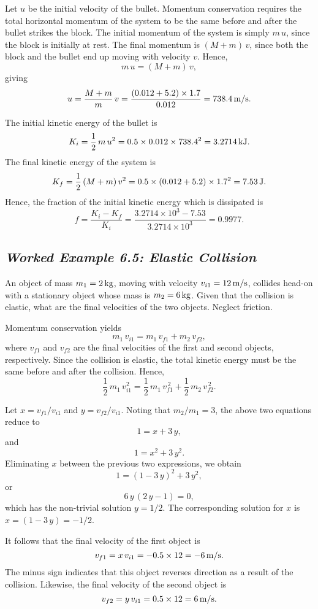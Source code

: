  Let $u$ be the initial velocity of the bullet.
Momentum conservation requires the total horizontal momentum of the
system to be the same before and after the bullet strikes the block.
The initial momentum of the system is simply $m\,u$, since the
block is initially at rest. The final momentum is $(M+m)\,v$, since
both the block and the bullet end up moving with velocity $v$. Hence,
$$
m\,u = (M+m)\,v,
$$
giving
$$
u = \frac{M+m}{m}\,v = \frac{(0.012+5.2)\times 1.7}{0.012} = 738.4\,{\rm m/s}.
$$

The initial kinetic energy of the bullet is
$$
K_i = \frac{1}{2}\,m\,u^2 = 0.5\times 0.012 \times 738.4^2 = 3.2714\,{\rm kJ}.
$$
The final kinetic energy of the system is
$$
K_f = \frac{1}{2}\,(M+m)\,v^2 = 0.5\times(0.012+5.2)\times 1.7^2 = 7.53\,{\rm J}.
$$
Hence, the fraction of the initial kinetic energy which is dissipated is
$$
f = \frac{K_i-K_f}{K_i} = \frac{3.2714\times 10^3-7.53}{3.2714\times 10^3} = 0.9977.
$$

\subsection*{\em Worked Example 6.5: Elastic Collision}
 An object of mass $m_1=2\,{\rm kg}$, moving
with velocity $v_{i1}= 12\,{\rm m/s}$,  collides head-on with
a stationary object whose mass is $m_2=6\,{\rm kg}$. Given that the collision
is elastic, what are the final velocities of the two objects. Neglect friction.

 Momentum conservation yields
$$
m_1\,v_{i1} = m_1\,v_{f1} + m_2\,v_{f2},
$$
where $v_{f1}$ and $v_{f2}$ are the final velocities of the first and second
objects, respectively. Since the collision is elastic, the total kinetic
energy must be the same before and after the collision. Hence,
$$
\frac{1}{2}\,m_1\,v_{i1}^2 = \frac{1}{2}\,m_1\,v_{f1}^{\,2} + \frac{1}{2}\,m_2 \,v_{f2}^{\,2}.
$$

Let $x=v_{f1}/v_{i1}$ and $y=v_{f2}/v_{i1}$. Noting that $m_2/m_1=3$, the above two
equations reduce to
$$
1 = x + 3\,y,
$$
and
$$
1 = x^2 + 3\,y^2.
$$
Eliminating $x$ between the previous two expressions, we obtain
$$
1 = (1-3\,y)^2 + 3\,y^2,
$$
or
$$
6\,y\,(2\,y-1)=0,
$$
which has the non-trivial solution $y=1/2$. The corresponding solution for $x$ is $x=
(1-3\,y)=-1/2$.

It follows that the final velocity of the first object is
$$
v_{f1} = x\,v_{i1} = -0.5\times12 = -6\,{\rm m/s}.
$$
The minus sign indicates that this object reverses direction as a
result of the collision. Likewise, the final velocity of the second object is
$$
v_{f2} = y\,v_{i1} = 0.5 \times 12 = 6\,{\rm m/s}.
$$ 

